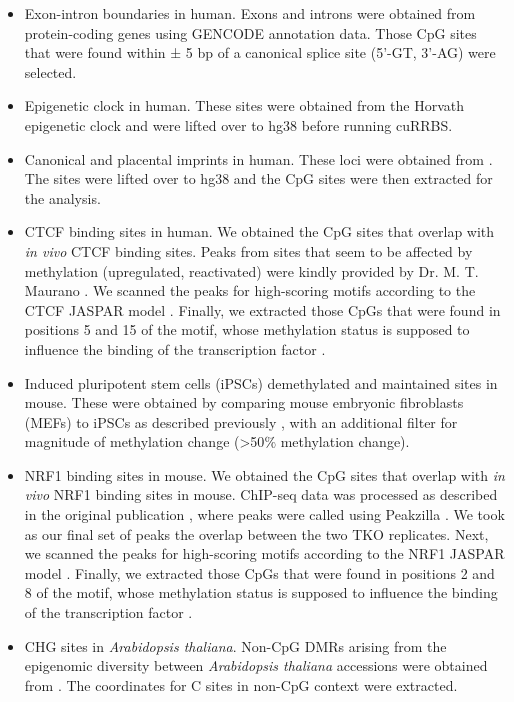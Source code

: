 \begin{itemize}

	\item Exon-intron boundaries in human. Exons and introns were obtained from protein-coding genes using GENCODE annotation data. Those CpG sites that were found within ± 5 bp of a canonical splice site (5'-GT, 3'-AG) were selected.
	
	\item Epigenetic clock in human. These sites were obtained from the Horvath epigenetic clock \citep{Horvath2013} and were lifted over to hg38 \citep{Kuhn2012} before running cuRRBS.
	
	\item Canonical and placental imprints in human. These loci were obtained from \citet{Hanna2016}. The sites were lifted over to hg38 \citep{Kuhn2012} and the CpG sites were then extracted for the analysis. 
	
	\item \acrshort{CTCF} binding sites in human. We obtained the CpG sites that overlap with \textit{in vivo} CTCF binding sites. Peaks from sites that seem to be affected by methylation (upregulated, reactivated) were kindly provided by Dr. M. T. Maurano \citep{Maurano2015}. We scanned the peaks for high-scoring motifs according to the CTCF JASPAR model \citep{Zhang2015a}. Finally, we extracted those CpGs that were found in positions 5 and 15 of the motif, whose methylation status is supposed to influence the binding of the transcription factor \citep{Maurano2015}. 
	
	\item Induced pluripotent stem cells (\acrshort{iPSCs}) demethylated and maintained sites in mouse. These were obtained by comparing mouse embryonic fibroblasts (\acrshort{MEFs}) to iPSCs as described previously \citep{Milagre2017}, with an additional filter for magnitude of methylation change (>50$\%$ methylation change).
	
	\item \acrshort{NRF1} binding sites in mouse. We obtained the CpG sites that overlap with \textit{in vivo} NRF1 binding sites in mouse. \acrshort{ChIP-seq} data was processed as described in the original publication \citep{Domcke2015}, where peaks were called using Peakzilla \citep{Bardet2013}. We took as our final set of peaks the overlap between the two \acrshort{TKO} replicates. Next, we scanned the peaks for high-scoring motifs according to the NRF1 JASPAR model \citep{Zhang2015a}. Finally, we extracted those CpGs that were found in positions 2 and 8 of the motif, whose methylation status is supposed to influence the binding of the transcription factor \citep{Zhang2015a}.
	
	\item CHG sites in \textit{Arabidopsis thaliana}. Non-CpG DMRs arising from the epigenomic diversity between \textit{Arabidopsis thaliana} accessions were obtained from \citet{Kawakatsu2016}. The coordinates for C sites in non-CpG context were extracted.
	
	
\end{itemize}

